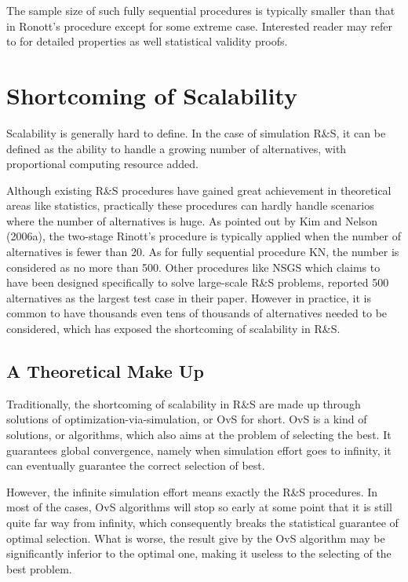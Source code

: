 \documentclass[12pt,a4paper]{report}
\begin{document}
The sample size of such fully sequential procedures is typically smaller than that in Ronott's procedure except for some extreme case. Interested reader may refer to \cite{ras-seq-jeff} for detailed properties as well statistical validity proofs.

\section{Shortcoming of Scalability}

Scalability is generally hard to define. In the case of simulation R\&S, it can be defined as the ability to handle a growing number of alternatives, with proportional computing resource added.

Although existing R\&S procedures have gained great achievement in theoretical areas like statistics, practically these procedures can hardly handle scenarios where the number of alternatives is huge. As pointed out by Kim and Nelson (2006a), the two-stage Rinott’s procedure is typically applied when the number of alternatives is fewer than 20. As for fully sequential procedure KN, the number is considered as no more than 500. Other procedures like NSGS which claims to have been designed specifically to solve large-scale R\&S problems, reported 500 alternatives as the largest test case in their paper. However in practice, it is common to have thousands even tens of thousands of alternatives needed to be considered, which has exposed the shortcoming of scalability in R\&S.

\subsection{A Theoretical Make Up}

Traditionally, the shortcoming of scalability in R\&S are made up through solutions of optimization-via-simulation, or OvS for short. OvS is a kind of solutions, or algorithms, which also aims at the problem of selecting the best. It guarantees global convergence, namely when simulation effort goes to infinity, it can eventually guarantee the correct selection of best.

However, the infinite simulation effort means exactly the R\&S procedures. In most of the cases, OvS algorithms will stop so early at some point that it is still quite far way from infinity, which consequently breaks the statistical guarantee of optimal selection. What is worse, the result give by the OvS algorithm may be significantly inferior to the optimal one, making it useless to the selecting of the best problem. 
\end{document}
